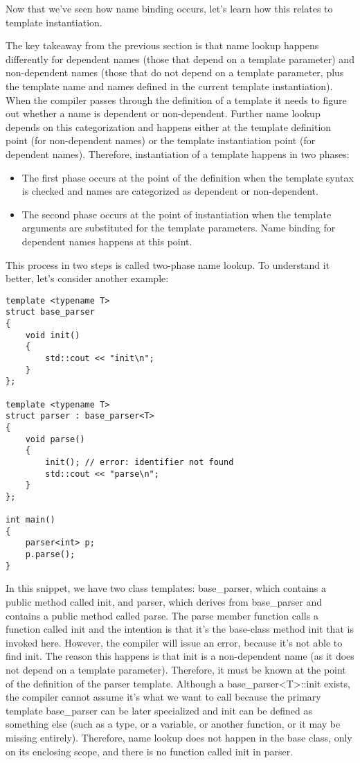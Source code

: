 Now that we’ve seen how name binding occurs, let’s learn how this relates to template instantiation.


The key takeaway from the previous section is that name lookup happens differently for dependent names (those that depend on a template parameter) and non-dependent names (those that do not depend on a template parameter, plus the template name and names defined in the current template instantiation). When the compiler passes through the definition of a template it needs to figure out whether a name is dependent or non-dependent. Further name lookup depends on this categorization and happens either at the template definition point (for non-dependent names) or the template instantiation point (for dependent names). Therefore, instantiation of a template happens in two phases:

\begin{itemize}
\item
The first phase occurs at the point of the definition when the template syntax is checked and names are categorized as dependent or non-dependent.

\item
The second phase occurs at the point of instantiation when the template arguments are substituted for the template parameters. Name binding for dependent names happens at this point.
\end{itemize}

This process in two steps is called two-phase name lookup. To understand it better, let’s consider another example:

\begin{lstlisting}[style=styleCXX]
template <typename T>
struct base_parser
{
	void init()
	{
		std::cout << "init\n";
	}
};

template <typename T>
struct parser : base_parser<T>
{
	void parse()
	{
		init(); // error: identifier not found
		std::cout << "parse\n";
	}
};

int main()
{
	parser<int> p;
	p.parse();
}
\end{lstlisting}

In this snippet, we have two class templates: base\_parser, which contains a public method called init, and parser, which derives from base\_parser and contains a public method called parse. The parse member function calls a function called init and the intention is that it’s the base-class method init that is invoked here. However, the compiler will issue an error, because it’s not able to find init. The reason this happens is that init is a non-dependent name (as it does not depend on a template parameter). Therefore, it must be known at the point of the definition of the parser template. Although a base\_parser<T>::init exists, the compiler cannot assume it’s what we want to call because the primary template base\_parser can be later specialized and init can be defined as something else (such as a type, or a variable, or another function, or it may be missing entirely). Therefore, name lookup does not happen in the base class, only on its enclosing scope, and there is no function called init in parser.
 
